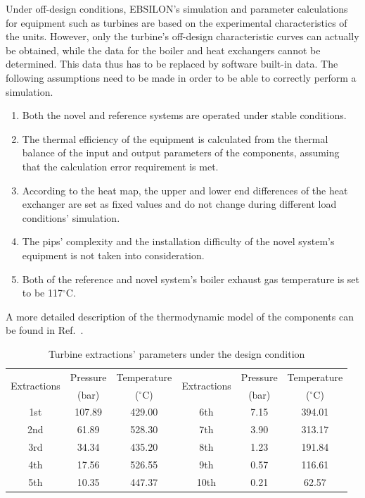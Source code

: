 \documentclass[preprint,12pt]{elsarticle}
\begin{document}
Under off-design conditions, EBSILON's simulation and parameter calculations for equipment such as turbines are based on the experimental characteristics of the units.
However, only the turbine's off-design characteristic curves can actually be obtained, while the data for the boiler and heat exchangers cannot be determined.
This data thus has to be replaced by software built-in data.
The following assumptions need to be made in order to be able to correctly perform a simulation.
\begin{enumerate}[(1)]
\item Both the novel and reference systems are operated under stable conditions.
\item The thermal efficiency of the equipment is calculated from the thermal balance of the input and output parameters of the components, assuming that the calculation error requirement is met.
\item According to the heat map, the upper and lower end differences of the heat exchanger are set as fixed values and do not change during different load conditions' simulation.
\item The pips' complexity and the installation difficulty of the novel system's equipment is not taken into consideration.
\item Both of the reference and novel system's boiler exhaust gas temperature is set to be 117$^\circ$C.
\end{enumerate}
A more detailed description of the thermodynamic model of the components can be found in Ref.~\cite{Yao2017Multi}. 
\begin{table}
\caption{Turbine extractions' parameters under the design condition}
\label{table:extractions_parameter}
\begin{centering}
\begin{tabular}{cccccc}
\toprule 
\multirow{2}{*}{Extractions} & Pressure & Temperature & \multirow{2}{*}{Extractions} & Pressure & Temperature\tabularnewline
 & (bar) & ($^\circ$C) &  & (bar) & ($^\circ$C)\tabularnewline
\midrule
1st & 107.89  & 429.00 & 6th & 7.15  & 394.01 \tabularnewline
2nd & 61.89 & 528.30  & 7th & 3.90  & 313.17\tabularnewline
3rd & 34.34 & 435.20  & 8th & 1.23  & 191.84\tabularnewline
4th & 17.56  & 526.55  & 9th & 0.57  & 116.61\tabularnewline
5th & 10.35  & 447.37 & 10th & 0.21 & 62.57\tabularnewline
\bottomrule
\end{tabular}
\par\end{centering}
\end{table}
\end{document}
